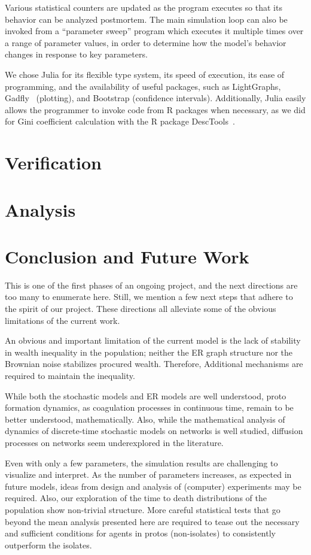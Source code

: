 Various statistical counters are updated as the program executes so that its behavior can be analyzed postmortem. The main simulation loop can also be invoked from a ``parameter sweep'' program which executes it multiple times over a range of parameter values, in order to determine how the model's behavior changes in response to key parameters.

We chose Julia for its flexible type system, its speed of execution, its ease of programming, and the availability of useful packages, such as LightGraphs, Gadfly~\cite{Gadfly-2018} (plotting), and Bootstrap (confidence intervals).  Additionally, Julia easily allows the programmer to invoke code from R packages when necessary, as we did for Gini coefficient calculation with the R package DescTools~\cite{DescTools-2019}.


\section{Verification}


\section{Analysis}

\section{Conclusion and Future Work}
This is one of the first phases of an ongoing project, and the next directions are too many to enumerate here. Still, we mention a few next steps that adhere to the spirit of our project. These directions all alleviate some of the obvious limitations of the current work. 

An obvious and important limitation of the current model is the lack of stability in wealth inequality in the population; neither the ER graph structure nor the Brownian noise stabilizes procured wealth. Therefore, Additional mechanisms are required to maintain the inequality.

While both the stochastic models and ER models are well understood, proto formation dynamics, as coagulation processes in continuous time, remain to be better understood, mathematically. Also, while the mathematical analysis of dynamics of discrete-time stochastic models on networks is well studied, diffusion processes on networks seem underexplored in the literature. 

Even with only a few parameters, the simulation results are challenging to visualize and interpret. As the number of parameters increases, as expected in future models, ideas from design and analysis of (computer) experiments may be required. Also, our exploration of the time to death distributions of the population show non-trivial structure. More careful statistical tests that go beyond the mean analysis presented here are required to tease out the necessary and sufficient conditions for agents in protos (non-isolates) to consistently outperform the isolates.   

